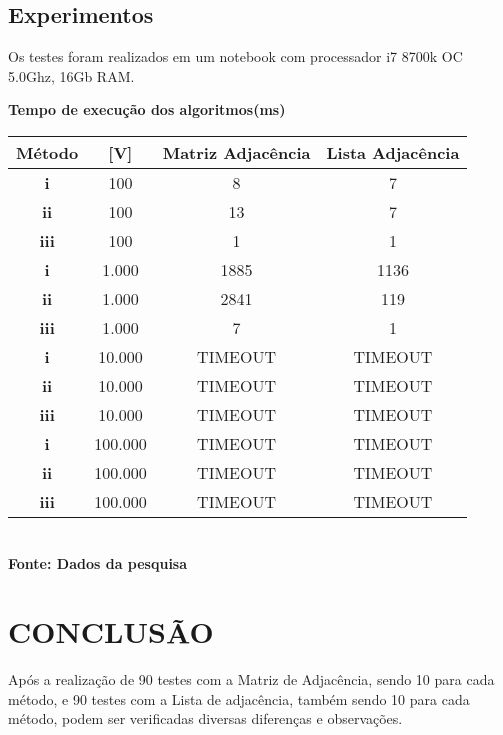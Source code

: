 \subsection{\esp Experimentos}

Os testes foram realizados em um notebook com processador i7 8700k OC 5.0Ghz, 16Gb RAM.   

   \begin{center}
          \centering
       	\textbf{Tempo de execução dos algoritmos(ms)}\\
        \label{quadro1}
	\begin{tabular}{|c|c|c|c|} \hline
	 
		\hline \textbf{	Método} & [V] & Matriz Adjacência	& Lista Adjacência \\ 
		 \hline \textbf{ i}  & 100 & 8 & 7 \\ 
		\hline \textbf{	ii} & 100 & 13 & 7 \\ 
		\hline \textbf{ iii} & 100 & 1 & 1	\\ 
		\hline \textbf{	i} & 1.000 & 1885 & 1136	\\ 
		\hline \textbf{	ii} & 1.000 & 2841 & 119 \\ 
		\hline \textbf{	iii} & 1.000 & 7 & 1	\\ 
        \hline \textbf{	i} & 10.000 & TIMEOUT & TIMEOUT	\\ 
		\hline \textbf{	ii} & 10.000 & TIMEOUT & TIMEOUT \\ 
		\hline \textbf{	iii} & 10.000 & TIMEOUT & TIMEOUT	\\ 
        \hline \textbf{	i} & 100.000 & TIMEOUT & TIMEOUT	\\ 
		\hline \textbf{	ii} & 100.000 & TIMEOUT & TIMEOUT \\ 
		\hline \textbf{	iii} & 100.000 & TIMEOUT & TIMEOUT	\\  
 		
		\hline
	\end{tabular}
	\vspace{0.1cm} 
	{\footnotesize\\ \textbf{Fonte: Dados da pesquisa}}
   \end{center}
   
   
\section{\esp CONCLUSÃO}

Após a realização de 90 testes com a Matriz de Adjacência, sendo 10 para cada método, e 90 testes com a Lista de adjacência, também sendo 10 para cada método, podem ser verificadas diversas diferenças e observações.

